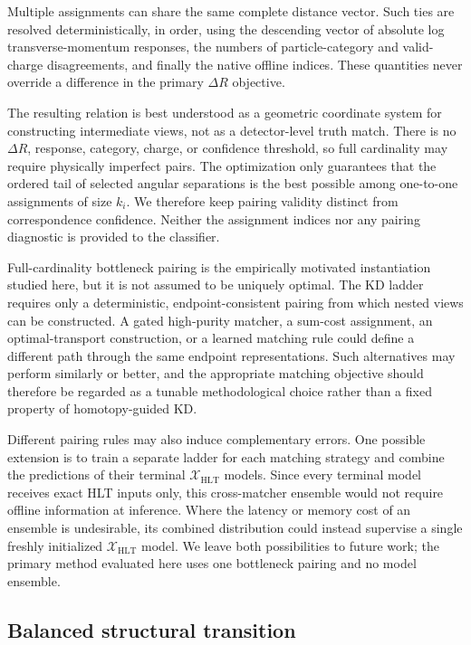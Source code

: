 \documentclass[11pt]{article}
\newcommand{\xhlt}{\mathcal{X}_{\mathrm{HLT}}}
\begin{document}
Multiple assignments can share the same complete distance vector.  Such ties
are resolved deterministically, in order, using the descending vector of
absolute log transverse-momentum responses, the numbers of particle-category
and valid-charge disagreements, and finally the native offline indices.
These quantities never override a difference in the primary $\Delta R$
objective.

The resulting relation is best understood as a geometric coordinate system
for constructing intermediate views, not as a detector-level truth match.
There is no $\Delta R$, response, category, charge, or confidence threshold,
so full cardinality may require physically imperfect pairs.  The optimization
only guarantees that the ordered tail of selected angular separations is the
best possible among one-to-one assignments of size $k_i$.  We therefore keep
pairing validity distinct from correspondence confidence.  Neither the
assignment indices nor any pairing diagnostic is provided to the classifier.

Full-cardinality bottleneck pairing is the empirically motivated
instantiation studied here, but it is not assumed to be uniquely optimal.
The KD ladder requires only a deterministic, endpoint-consistent pairing from
which nested views can be constructed.  A gated high-purity matcher, a
sum-cost assignment, an optimal-transport construction, or a learned matching
rule could define a different path through the same endpoint representations.
Such alternatives may perform similarly or better, and the appropriate
matching objective should therefore be regarded as a tunable methodological
choice rather than a fixed property of homotopy-guided KD.

Different pairing rules may also induce complementary errors.  One possible
extension is to train a separate ladder for each matching strategy and combine
the predictions of their terminal $\xhlt$ models.  Since every terminal model
receives exact HLT inputs only, this cross-matcher ensemble would not require
offline information at inference.  Where the latency or memory cost of an
ensemble is undesirable, its combined distribution could instead supervise a
single freshly initialized $\xhlt$ model.  We leave both possibilities to
future work; the primary method evaluated here uses one bottleneck pairing
and no model ensemble.

\subsection{Balanced structural transition}
\end{document}
